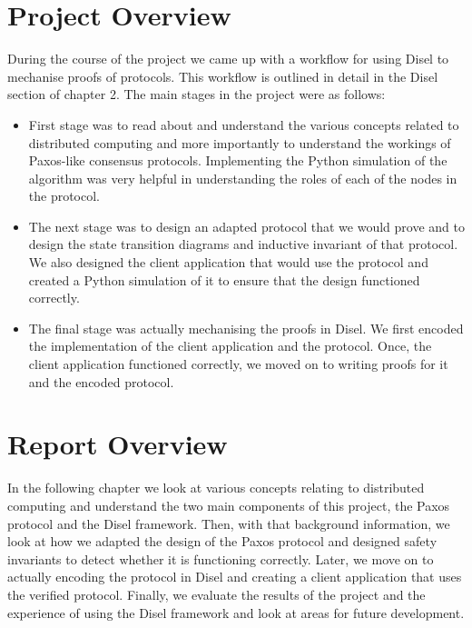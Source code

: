 \vspace{-4mm}
\section{Project Overview}
During the course of the
project we came up with a workflow for using Disel to mechanise proofs of protocols.
This workflow is outlined in detail in the Disel section of chapter 2. The main
stages in the project were as follows:
\begin{itemize}
\itemsep0em
  \item First stage was to read about and understand the various concepts related
    to distributed computing and more importantly to understand the workings of
    Paxos-like consensus protocols. Implementing the Python simulation of the
    algorithm was very helpful in understanding the roles of each of the nodes
    in the protocol.

  \item The next stage was to design an adapted protocol that we would prove and
    to design the state transition diagrams and inductive invariant of that protocol.
    We also designed the client application that would use the protocol and created
    a Python simulation of it to ensure that the design functioned correctly.

  \item The final stage was actually mechanising the proofs in Disel. We first
    encoded the implementation of the client application and the protocol. Once,
    the client application functioned correctly, we moved on to writing proofs
    for it and the encoded protocol.
\end{itemize}

\vspace{-4mm}
\section{Report Overview}
In the following chapter we look at various concepts relating to distributed
computing and understand the two main components of this project, the Paxos
protocol and the Disel framework. Then, with that background information,
we look at how we adapted the design of the Paxos protocol and designed
safety invariants to detect whether it is functioning correctly. Later,
we move on to actually encoding the protocol in Disel and creating a client
application that uses the verified protocol.
Finally, we evaluate the results of the project and the
experience of using the Disel framework and look at areas for future
development.
